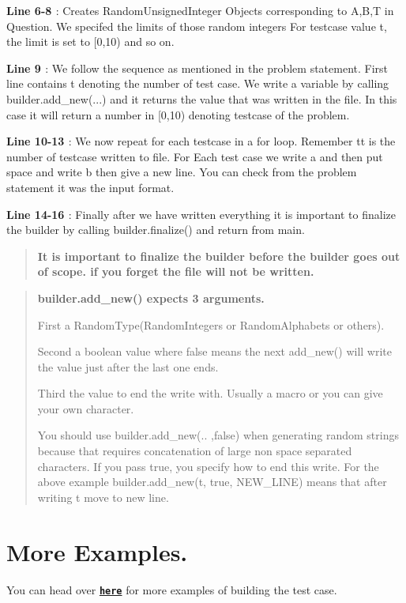 {\bfseries{Line 6-\/8 }} \+: Creates Random\+Unsigned\+Integer Objects corresponding to A,B,T in Question. We specifed the limits of those random integers For testcase value t, the limit is set to \mbox{[}0,10) and so on.

{\bfseries{Line 9 }} \+: We follow the sequence as mentioned in the problem statement. First line contains t denoting the number of test case. We write a variable by calling {\ttfamily builder.\+add\+\_\+new(...)} and it returns the value that was written in the file. In this case it will return a number in \mbox{[}0,10) denoting testcase of the problem.

{\bfseries{Line 10-\/13 }} \+: We now repeat for each testcase in a for loop. Remember {\ttfamily tt} is the number of testcase written to file. For Each test case we write \textquotesingle{}a\textquotesingle{} and then put space and write \textquotesingle{}b\textquotesingle{} then give a new line. You can check from the problem statement it was the input format.

{\bfseries{Line 14-\/16 }} \+: Finally after we have written everything it is important to finalize the builder by calling {\ttfamily builder.\+finalize()} and return from main.

\begin{quote}
{\bfseries{It is important to finalize the builder before the builder goes out of scope. if you forget the file will not be written. }} \end{quote}
\begin{quote}
{\bfseries{builder.\+add\+\_\+new() expects 3 arguments.}}

First a Random\+Type(\+Random\+Integers or Random\+Alphabets or others).

Second a boolean value where false means the next add\+\_\+new() will write the value just after the last one ends.

Third the value to end the write with. Usually a macro or you can give your own character.

You should use {\ttfamily builder.\+add\+\_\+new(.. ,false)} when generating random strings because that requires concatenation of large non space separated characters. If you pass true, you specify how to end this write. For the above example {\ttfamily builder.\+add\+\_\+new(t, true, N\+E\+W\+\_\+\+L\+I\+N\+E)} means that after writing t move to new line. \end{quote}
\hypertarget{index_more_example}{}\section{More Examples.}\label{index_more_example}
You can head over 
\href{https://github.com/coder3101/testcaser/tree/master/examples}{\texttt{ {\bfseries{here}}}} for more examples of building the test case. 